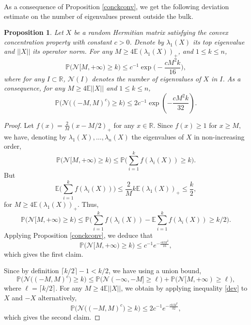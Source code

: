\documentclass[aop,preprint]{imsart}
\newcommand\RR{\mathbb{R}}
\newcommand\PP{\mathbb{P}}
\newcommand\EE{\mathbb{E}}
\numberwithin{equation}{section}
\theoremstyle{definition}
\theoremstyle{plain}
\newtheorem{Pro}[Def]{Proposition}
\theoremstyle{remark}
\begin{document}
As a consequence of Proposition \ref{conckconv}, we get the following deviation estimate on the number of eigenvalues present outside the bulk.
\begin{Pro}\label{probatrou} Let $X$ be a random Hermitian matrix satisfying the convex concentration property with constant $c>0$. Denote by $\lambda_1(X)$ its top eigenvalue and $||X||$ its operator norm.
For any $M\geq 4\EE( \lambda_1(X))_+$, and $1\leq k \leq n$,
$$ \PP \big(  \mathcal{N}[M,+\infty) \geq k \big) \leq   c^{-1}\exp \Big( -\frac{c M^2 k}{16}\Big),$$
where for any $I \subset \RR$, $\mathcal{N}(I)$ denotes the number of eigenvalues of $X$ in $I$.
As a consequence, for any $M\geq 4\EE ||X||$  and $1\leq k \leq n$,
$$\PP \big(  \mathcal{N}\big((-M,M)^c\big) \geq k \big) \leq 2c^{-1}\exp\left( -\frac{c  M^2k}{32}\right).$$
\end{Pro}
\begin{proof}
 Let $f(x)= \frac{2}{M}(x-M/2)_+$ for any $x\in \RR$.
 Since $f(x) \geq 1$ for $x\geq M$,  we have, denoting by $\lambda_1(X),\ldots,\lambda_n(X)$ the eigenvalues of $X$ in non-increasing order,
$$\PP \big(  \mathcal{N}[M,+\infty) \geq k \big) \leq  \PP\big( \sum_{i=1}^k f(\lambda_i(X)) \geq k\big).$$
But 
$$\EE\Big( \sum_{i=1}^k f(\lambda_i(X)) \Big)\leq \frac{2}{M}k \EE (\lambda_1(X))_+ \leq \frac{k}{2},$$
for $M\geq 4\EE (\lambda_1(X))_+$. Thus,
$$\PP \big(  \mathcal{N}[M,+\infty) \geq k \big) \leq  \PP\Big( \sum_{i=1}^k f(\lambda_i(X))- \EE \sum_{i=1}^k f(\lambda_i(X)) \geq k/2\Big).$$
Applying Proposition \ref{conckconv}, we deduce that
\begin{equation} \label{dev} \PP \big(  \mathcal{N}[M,+\infty) \geq k \big) \leq   c^{-1}e^{-\frac{ck M^2}{16}},\end{equation}
which gives the first claim.

Since by definition $\lceil k/2 \rceil -1 <k/2$, we have using a union bound,
$$\PP \big(  \mathcal{N}\big((-M,M)^c\big) \geq k \big) \leq \PP \big(  \mathcal{N}(-\infty,-M] \geq \ell \big)  +\PP \big(  \mathcal{N}[M,+\infty) \geq \ell \big),$$
where $\ell = \lceil k/2 \rceil$.
For any $M\geq 4 \EE || X||$, we obtain by applying inequality \eqref{dev} to $X$ and $-X$ alternatively, 
$$\PP \big(  \mathcal{N}\big((-M,M)^c\big) \geq k \big) \leq  2c^{-1}e^{-\frac{c k M^2}{32}},$$
which gives the second claim.




\end{proof}
\end{document}
